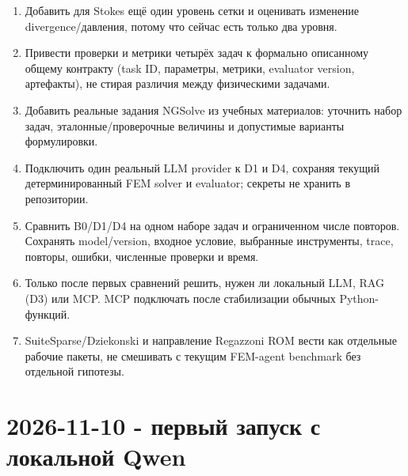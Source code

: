 \documentclass[11pt,a4paper]{article}
\begin{document}
\begin{enumerate}
    \item Добавить для Stokes ещё один уровень сетки и оценивать изменение divergence/давления, потому что сейчас есть только два уровня.
    \item Привести проверки и метрики четырёх задач к формально описанному общему контракту (task ID, параметры, метрики, evaluator version, артефакты), не стирая различия между физическими задачами.
    \item Добавить реальные задания NGSolve из учебных материалов: уточнить набор задач, эталонные/проверочные величины и допустимые варианты формулировки.
    \item Подключить один реальный LLM provider к D1 и D4, сохраняя текущий детерминированный FEM solver и evaluator; секреты не хранить в репозитории.
    \item Сравнить B0/D1/D4 на одном наборе задач и ограниченном числе повторов. Сохранять model/version, входное условие, выбранные инструменты, trace, повторы, ошибки, численные проверки и время.
    \item Только после первых сравнений решить, нужен ли локальный LLM, RAG (D3) или MCP. MCP подключать после стабилизации обычных Python-функций.
    \item SuiteSparse/Dziekonski и направление Regazzoni ROM вести как отдельные рабочие пакеты, не смешивать с текущим FEM-agent benchmark без отдельной гипотезы.
\end{enumerate}

\section{2026-11-10 - первый запуск с локальной Qwen}
\end{document}
